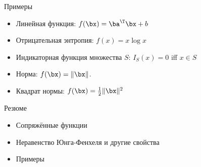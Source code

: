 \documentclass[12pt,russian]{beamer}
\begin{document}
\begin{frame}{Примеры}
\begin{itemize}
\item Линейная функция: $f(\bx) = \ba^{\T}\bx + b$
\item Отрицательная энтропия: $f(x) = x\log x$
\item Индикаторная функция множества $S$: $I_S(x) = 0$ iff $x \in S$
\item Норма: $f(\bx) = \|\bx\|$.
\item Квадрат нормы: $f(\bx) = \frac{1}{2}\|\bx\|^2$
\end{itemize}
\end{frame}

\begin{frame}{Резюме}

\begin{itemize}
\item Сопряжённые функции
\item Неравенство Юнга-Фенхеля и другие свойства
\item Примеры
\end{itemize}

\end{frame}
\end{document}
